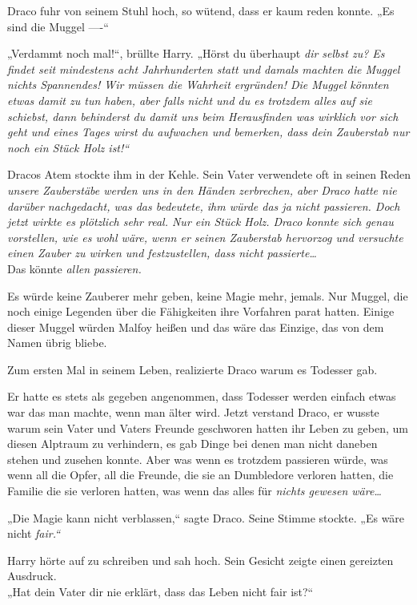 {Draco fuhr von seinem Stuhl hoch, so wütend, dass er kaum reden konnte. „Es sind die Muggel ----“

„Verdammt noch mal!“, brüllte Harry. „Hörst du überhaupt \emph{dir selbst zu? Es findet seit mindestens acht Jahrhunderten statt und damals machten die Muggel nichts Spannendes! \emph{Wir müssen die Wahrheit} \emph{ergründen!} Die Muggel \emph{könnten} etwas damit zu tun haben, aber falls nicht und du es trotzdem alles auf sie schiebst, dann behinderst du damit uns beim Herausfinden was wirklich vor sich geht und eines Tages wirst du aufwachen und bemerken, dass dein Zauberstab nur noch ein Stück Holz ist!“}

Dracos Atem stockte ihm in der Kehle. Sein Vater verwendete oft in seinen Reden \emph{unsere Zauberstäbe werden uns in den Händen zerbrechen, aber Draco hatte nie darüber nachgedacht, was das bedeutete, \emph{ihm} würde das ja nicht passieren. Doch jetzt wirkte es plötzlich sehr real. \emph{Nur ein Stück Holz.} Draco konnte sich genau vorstellen, wie es wohl wäre, wenn er seinen Zauberstab hervorzog und versuchte einen Zauber zu wirken und festzustellen, dass nicht passierte…}\\ Das könnte \emph{allen passieren.}

Es würde keine Zauberer mehr geben, keine Magie mehr, jemals. Nur Muggel, die noch einige Legenden über die Fähigkeiten ihre Vorfahren parat hatten. Einige dieser Muggel würden Malfoy heißen und das wäre das Einzige, das von dem Namen übrig bliebe.

Zum ersten Mal in seinem Leben, realizierte Draco warum es Todesser gab.

Er hatte es stets als gegeben angenommen, dass Todesser werden einfach etwas war das man machte, wenn man älter wird. Jetzt verstand Draco, er wusste warum sein Vater und Vaters Freunde geschworen hatten ihr Leben zu geben, um diesen Alptraum zu verhindern, es gab Dinge bei denen man nicht daneben stehen und zusehen konnte. Aber was wenn es trotzdem passieren würde, was wenn all die Opfer, all die Freunde, die sie an Dumbledore verloren hatten, die Familie die sie verloren hatten, was wenn das alles für \emph{nicht\emph{s} gewesen wäre…}

„Die Magie kann nicht verblassen,“ sagte Draco. Seine Stimme stockte. „Es wäre nicht \emph{fair.“}

Harry hörte auf zu schreiben und sah hoch. Sein Gesicht zeigte einen gereizten Ausdruck.\\ „Hat dein Vater dir nie erklärt, dass das Leben nicht fair ist?“

}
